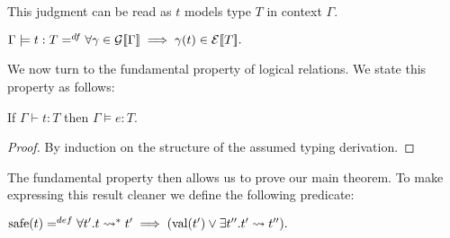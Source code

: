 This judgment can be read as $t$ models type $T$ in context $\Gamma$.
\begin{center}
  \begin{math}
    \Gamma \models t : T =^{df} \forall \gamma \in \mathcal{G}[\negthinspace[\Gamma]\negthinspace] \implies
    \gamma(t) \in \mathcal{E}[\negthinspace[T]\negthinspace].
  \end{math}
\end{center}
\noindent
We now turn to the fundamental property of logical relations.  We state this property as
follows:
\begin{lemma}
  \label{lemma:fundamental_property}
  If $\Gamma \vdash t : T$ then $\Gamma \models e : T$.
\end{lemma}
\begin{proof}
  By induction on the structure of the assumed typing derivation.
\end{proof}
\noindent
The fundamental property then allows us to prove our main theorem.  To make
expressing this result cleaner we define the following predicate:
\begin{center}
  \begin{math}
    \text{safe}(t) =^{def} \forall t'.t \rightsquigarrow^* t' \implies (\text{val}(t') \lor \exists t''.t' \rightsquigarrow t'').
  \end{math}
\end{center}

